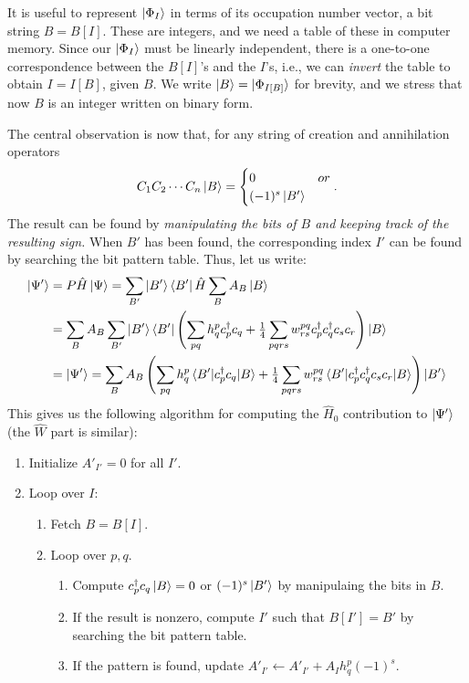 \documentclass{report}
\theoremstyle{plain}
\theoremstyle{definition}
\begin{document}
It is useful to represent $\ket{\Phi_I}$ in terms of its occupation
number vector, a bit string $B = B[I]$. These are integers, and we
need a table of these in computer memory. Since our $\ket{\Phi_I}$
must be linearly independent, there is a one-to-one correspondence
between the $B[I]$'s and the $I$'s, i.e., we can \emph{invert} the
table to obtain $I = I[B]$, given $B$. We write $\ket{B} =
\ket{\Phi_{I[B]}}$ for brevity, and we stress that now $B$ is an
integer written on binary form.

The central observation is now that, for any string of creation and
annihilation operators
\begin{equation}
  C_1 C_2 \cdots C_n \ket{B} = \begin{cases} 0 & or \\ (-1)^s
    \ket{B'} \end{cases}.
\end{equation}
The result can be found by \emph{manipulating the bits of $B$ and
  keeping track of the resulting sign.} When $B'$ has been found, the
corresponding index $I'$ can be found by searching the bit pattern
table. Thus, let us write:
\begin{equation}
  \begin{split}
    \ket{\Psi'} &= P \hat{H}\ket{\Psi} = \sum_{B'}
    \ket{B'}\bra{B'} \hat{H} \sum_B A_B \ket{B} \\
    & = \sum_B A_B \sum_{B'} \ket{B'} \bra{B'}\left(\sum_{pq} h^p_q
      c^\dag_p c_q + \tfrac{1}{4}\sum_{pqrs} w^{pq}_{rs} c^\dag_p
      c^\dag_q c_s c_r \right) \ket{B} \\
 & =
  \ket{\Psi'} = \sum_B A_B \left(\sum_{pq} h^{p}_q \braket{B'|c^\dag_p c_q|B} +
  \tfrac{1}{4}\sum_{pqrs} w^{pq}_{rs} \braket{B'|c^\dag_p c^\dag_q c_s
    c_r|B}\right) \ket{B'}
\end{split}
\end{equation}
This gives us the following algorithm for computing the $\hat{H}_0$
contribution to $\ket{\Psi'}$ (the $\hat{W}$ part is similar):
\begin{enumerate}
\item
  Initialize $A'_{I'} = 0$ for all $I'$.
\item
  Loop over $I$:
  \begin{enumerate}
  \item
    Fetch $B = B[I]$.
  \item
    Loop over $p,q$.
    \begin{enumerate}
    \item
      Compute $c^\dag_p c_q \ket{B} = 0$ or $(-1)^s\ket{B'}$ by
      manipulaing the bits in $B$.
    \item
      If the result is nonzero, compute $I'$ such that $B[I'] = B'$ by
      searching the bit pattern table.
    \item
      If the pattern is found, update $A'_{I'} \leftarrow A'_{I'} +
      A_I h^{p}_q (-1)^s$.
      
    \end{enumerate}
  \end{enumerate}  
\end{enumerate}
\end{document}
